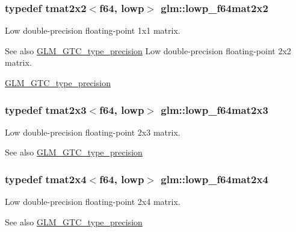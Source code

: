 \subsubsection[{lowp\+\_\+f64mat2x2}]{\setlength{\rightskip}{0pt plus 5cm}typedef tmat2x2$<${\bf f64}, lowp$>$ {\bf glm\+::lowp\+\_\+f64mat2x2}}\label{namespaceglm_aa0842065affce367ff31e0d9af433c3d}
Low double-\/precision floating-\/point 1x1 matrix. \begin{DoxySeeAlso}{See also}
\hyperlink{group__gtc__type__precision}{G\+L\+M\+\_\+\+G\+T\+C\+\_\+type\+\_\+precision} Low double-\/precision floating-\/point 2x2 matrix. 

\hyperlink{group__gtc__type__precision}{G\+L\+M\+\_\+\+G\+T\+C\+\_\+type\+\_\+precision} 
\end{DoxySeeAlso}
\hypertarget{namespaceglm_a9ac05a44a0c0578915e80a0ca43f2b46}{}
\subsubsection[{lowp\+\_\+f64mat2x3}]{\setlength{\rightskip}{0pt plus 5cm}typedef tmat2x3$<${\bf f64}, lowp$>$ {\bf glm\+::lowp\+\_\+f64mat2x3}}\label{namespaceglm_a9ac05a44a0c0578915e80a0ca43f2b46}
Low double-\/precision floating-\/point 2x3 matrix. \begin{DoxySeeAlso}{See also}
\hyperlink{group__gtc__type__precision}{G\+L\+M\+\_\+\+G\+T\+C\+\_\+type\+\_\+precision} 
\end{DoxySeeAlso}
\hypertarget{namespaceglm_ada6da92233bccc6b7b1089d25a29a62b}{}
\subsubsection[{lowp\+\_\+f64mat2x4}]{\setlength{\rightskip}{0pt plus 5cm}typedef tmat2x4$<${\bf f64}, lowp$>$ {\bf glm\+::lowp\+\_\+f64mat2x4}}\label{namespaceglm_ada6da92233bccc6b7b1089d25a29a62b}
Low double-\/precision floating-\/point 2x4 matrix. \begin{DoxySeeAlso}{See also}
\hyperlink{group__gtc__type__precision}{G\+L\+M\+\_\+\+G\+T\+C\+\_\+type\+\_\+precision} 
\end{DoxySeeAlso}
\hypertarget{namespaceglm_a4acbda53fb7ff9568c0a2786fad450b8}{}
